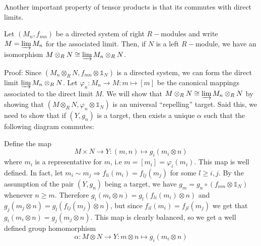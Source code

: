 Another important property of tensor products is that its commutes with direct limits.
\begin{dang}
    \begin{theorem}\label{theorem: direct limit commute with tensor product}
        Let $(M_n, f_{mn})$ be a directed system of right $R-$modules and write $M=\varinjlim M_n$ for the associated limit. Then, if $N$ is a left $R-$module, we have an isomorphism $M\otimes_RN\cong \varinjlim M_n\otimes_RN$.
    \end{theorem}
\end{dang}
Proof: Since $(M_n\otimes_RN,f_{mn}\otimes \mathds{1}_N)$ is a directed system, we can form the direct limit $\varinjlim M_n\otimes_R N$. Let $\varphi_n:M_n\rightarrow M:m\mapsto [m]$ be the canonical mappings associated to the direct limit $M$. We will show that $M\otimes_RN\cong \varinjlim M_n\otimes_R N$ by showing that  $(M\otimes_RN, \varphi_n\otimes \mathds{1}_N)$ is an universal ``repelling'' target. Said this, we need to show that if $(Y,g_n)$ is a target, then exists a unique $\alpha$ such that the following diagram commutes:
\begin{center}
\end{center}
Define the map 
\begin{equation}
    M\times N\rightarrow Y: (m,n)\mapsto g_i(m_i\otimes n)
\end{equation}
where $m_i$ is a representative for $m$, i.e $m=[m_i]=\varphi_i(m_i)$. This map is well defined. In fact, let $m_i\sim m_j\Rightarrow f_{li}(m_i)=f_{lj}(m_j)$ for some $l\geq i,j$. By the assumption of the pair $(Y, g_n)$ being a target, we have $g_{m}=g_n\circ (f_{nm}\otimes \mathds{1}_N)$ whenever $n\geq m$. Therefore $g_i(m_i\otimes n)=g_l(f_{li}(m_i)\otimes n)$ and $g_j(m_j\otimes n)=g_l(f_{lj}(m_j)\otimes n)$, but since $f_{il}(m_i)=f_{jl}(m_j)$ we get that $g_i(m_i\otimes n)=g_j(m_j\otimes n)$. This map is clearly balanced, so we get a well defined group homomorphism 
\begin{equation}
    \alpha: M\otimes N\rightarrow Y: m\otimes n\mapsto g_i(m_i\otimes n)
\end{equation}
